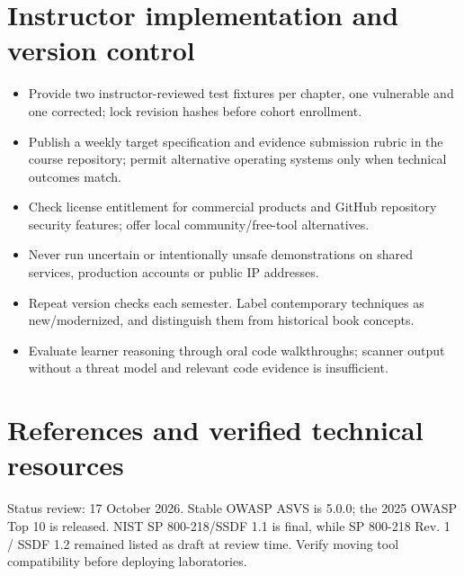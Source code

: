 \documentclass[10pt,letterpaper]{article}
\begin{document}
\section{Instructor implementation and version control}
\begin{itemize}[leftmargin=*,itemsep=2pt]
\item Provide two instructor-reviewed test fixtures per chapter, one vulnerable and one corrected; lock revision hashes before cohort enrollment.
\item Publish a weekly target specification and evidence submission rubric in the course repository; permit alternative operating systems only when technical outcomes match.
\item Check license entitlement for commercial products and GitHub repository security features; offer local community/free-tool alternatives.
\item Never run uncertain or intentionally unsafe demonstrations on shared services, production accounts or public IP addresses.
\item Repeat version checks each semester. Label contemporary techniques as new/modernized, and distinguish them from historical book concepts.
\item Evaluate learner reasoning through oral code walkthroughs; scanner output without a threat model and relevant code evidence is insufficient.
\end{itemize}
\section{References and verified technical resources}
Status review: 17 October 2026. Stable OWASP ASVS is 5.0.0; the 2025 OWASP Top 10 is released. NIST SP 800-218/SSDF 1.1 is final, while SP 800-218 Rev. 1 / SSDF 1.2 remained listed as draft at review time. Verify moving tool compatibility before deploying laboratories.
\end{document}
